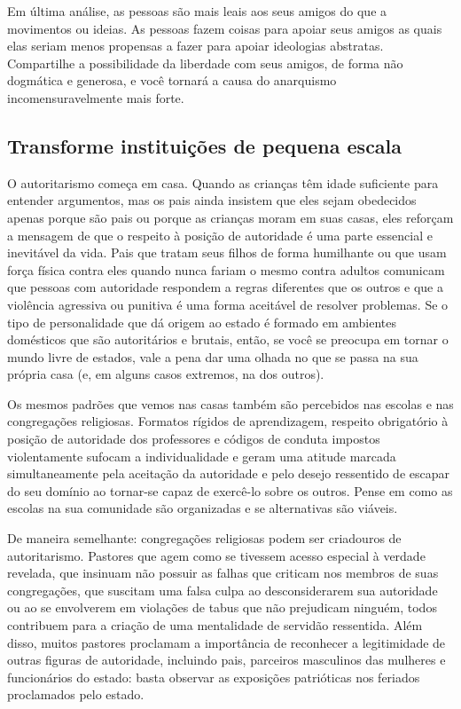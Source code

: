 Em última análise, as pessoas são mais leais aos seus amigos do que a movimentos ou ideias. As pessoas fazem coisas para apoiar seus amigos as quais elas seriam menos propensas a fazer para apoiar ideologias abstratas. Compartilhe a possibilidade da liberdade com seus amigos, de forma não dogmática e generosa, e você tornará a causa do anarquismo incomensuravelmente mais forte.

\subsection*{Transforme instituições de pequena escala}

O autoritarismo começa em casa. Quando as crianças têm idade suficiente para entender argumentos, mas os pais ainda insistem que eles sejam obedecidos apenas porque são pais ou porque as crianças moram em suas casas, eles reforçam a mensagem de que o respeito à posição de autoridade é uma parte essencial e inevitável da vida. Pais que tratam seus filhos de forma humilhante ou que usam força física contra eles quando nunca fariam o mesmo contra adultos comunicam que pessoas com autoridade respondem a regras diferentes que os outros e que a violência agressiva ou punitiva é uma forma aceitável de resolver problemas. Se o tipo de personalidade que dá origem ao estado é formado em ambientes domésticos que são autoritários e brutais, então, se você se preocupa em tornar o mundo livre de estados, vale a pena dar uma olhada no que se passa na sua própria casa (e, em alguns casos extremos, na dos outros).

Os mesmos padrões que vemos nas casas também são percebidos nas escolas e nas congregações religiosas. Formatos rígidos de aprendizagem, respeito obrigatório à posição de autoridade dos professores e códigos de conduta impostos violentamente sufocam a individualidade e geram uma atitude marcada simultaneamente pela aceitação da autoridade e pelo desejo ressentido de escapar do seu domínio ao tornar-se capaz de exercê-lo sobre os outros. Pense em como as escolas na sua comunidade são organizadas e se alternativas são viáveis.

De maneira semelhante: congregações religiosas podem ser criadouros de autoritarismo. Pastores que agem como se tivessem acesso especial à verdade revelada, que insinuam não possuir as falhas que criticam nos membros de suas congregações, que suscitam uma falsa culpa ao desconsiderarem sua autoridade ou ao se envolverem em violações de tabus que não prejudicam ninguém, todos contribuem para a criação de uma mentalidade de servidão ressentida. Além disso, muitos pastores proclamam a importância de reconhecer a legitimidade de outras figuras de autoridade, incluindo pais, parceiros masculinos das mulheres e funcionários do estado: basta observar as exposições patrióticas nos feriados proclamados pelo estado.

